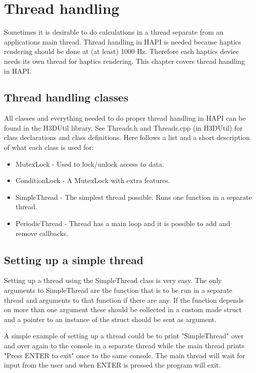 \chapter{Thread handling}

Sometimes it is desirable to do calculations in a thread separate from an
applications main thread. Thread handling in HAPI is needed because haptics
rendering should be done at (at least) 1000 Hz. Therefore each haptics device
needs its own thread for haptics rendering. This chapter covers thread handling
in HAPI.

\section{Thread handling classes}
All classes and everything needed to do proper thread handling in HAPI can be
found in the H3DUtil library. See Threads.h and Threads.cpp (in H3DUtil) for
class declarations and class definitions. Here follows a list and a short
description of what each class is used for:

\begin{itemize}
\item MutexLock - Used to lock/unlock access to data.
\item ConditionLock - A MutexLock with extra features.
\item SimpleThread - The simplest thread possible. Runs one function in a
separate thread.
\item PeriodicThread - Thread has a main loop and it is possible to add and
remove callbacks.
\end{itemize}

\section{Setting up a simple thread}
\label{secSimpleThread}
Setting up a thread using the SimpleThread class is very easy.
The only arguments to SimpleThread are the function that is to be run in a
separate thread and arguments to that function if there are any. If the
function depends on more than one argument these should be collected in a
custom made struct and a pointer to an instance of the struct should be sent
as argument.

A simple example of setting up a thread could be to print "SimpleThread"
over and over again to the console in a separate thread while the main thread
prints "Press ENTER to exit" once to the same console. The main thread will
wait for input from the user and when ENTER is pressed the program will exit.

